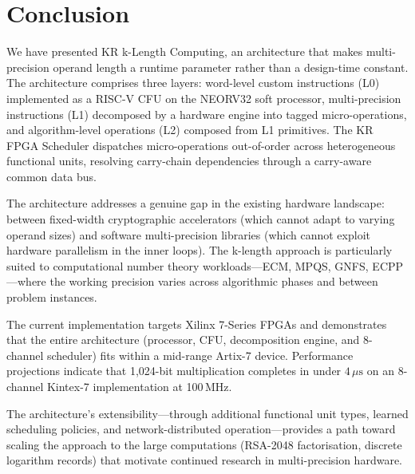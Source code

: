 \documentclass[11pt,a4paper]{article}
\begin{document}
\section{Conclusion}
\label{sec:conclusion}

We have presented KR k-Length Computing, an architecture that makes
multi-precision operand length a runtime parameter rather than a design-time
constant.  The architecture comprises three layers: word-level custom
instructions (L0) implemented as a RISC-V CFU on the NEORV32 soft processor,
multi-precision instructions (L1) decomposed by a hardware engine into
tagged micro-operations, and algorithm-level operations (L2) composed from
L1 primitives.  The KR FPGA Scheduler dispatches micro-operations
out-of-order across heterogeneous functional units, resolving carry-chain
dependencies through a carry-aware common data bus.

The architecture addresses a genuine gap in the existing hardware landscape:
between fixed-width cryptographic accelerators (which cannot adapt to
varying operand sizes) and software multi-precision libraries (which cannot
exploit hardware parallelism in the inner loops).  The k-length approach
is particularly suited to computational number theory workloads---ECM,
MPQS, GNFS, ECPP---where the working precision varies across algorithmic
phases and between problem instances.

The current implementation targets Xilinx 7-Series FPGAs and demonstrates
that the entire architecture (processor, CFU, decomposition engine, and
8-channel scheduler) fits within a mid-range Artix-7 device.  Performance
projections indicate that 1,024-bit multiplication completes in under
$4\,\mu\text{s}$ on an 8-channel Kintex-7 implementation at 100\,MHz.

The architecture's extensibility---through additional functional unit types,
learned scheduling policies, and network-distributed operation---provides a
path toward scaling the approach to the large computations (RSA-2048
factorisation, discrete logarithm records) that motivate continued research
in multi-precision hardware.




\end{document}
